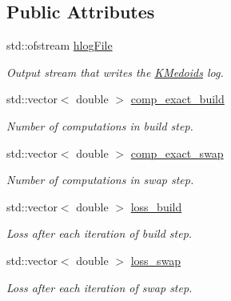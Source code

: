 \subsection*{Public Attributes}
\begin{DoxyCompactItemize}
\item 
\mbox{\label{structLogHelper_a084e11845451a653f46a48ab92c97ee8}} 
std\+::ofstream \hyperlink{structLogHelper_a084e11845451a653f46a48ab92c97ee8}{hlog\+File}
\begin{DoxyCompactList}\small\item\em Output stream that writes the \hyperlink{classKMedoids}{K\+Medoids} log. \end{DoxyCompactList}\item 
\mbox{\label{structLogHelper_a7f9490e07d6bfc71b0d0fd555ca4f530}} 
std\+::vector$<$ double $>$ \hyperlink{structLogHelper_a7f9490e07d6bfc71b0d0fd555ca4f530}{comp\+\_\+exact\+\_\+build}
\begin{DoxyCompactList}\small\item\em Number of computations in build step. \end{DoxyCompactList}\item 
\mbox{\label{structLogHelper_aaee1d830760c6b497f2fad31a0e368f8}} 
std\+::vector$<$ double $>$ \hyperlink{structLogHelper_aaee1d830760c6b497f2fad31a0e368f8}{comp\+\_\+exact\+\_\+swap}
\begin{DoxyCompactList}\small\item\em Number of computations in swap step. \end{DoxyCompactList}\item 
\mbox{\label{structLogHelper_a8da7e85d166977478fcfe848bb739dfa}} 
std\+::vector$<$ double $>$ \hyperlink{structLogHelper_a8da7e85d166977478fcfe848bb739dfa}{loss\+\_\+build}
\begin{DoxyCompactList}\small\item\em Loss after each iteration of build step. \end{DoxyCompactList}\item 
\mbox{\label{structLogHelper_a3361ae9284a7fca5b867165e0380af4b}} 
std\+::vector$<$ double $>$ \hyperlink{structLogHelper_a3361ae9284a7fca5b867165e0380af4b}{loss\+\_\+swap}
\begin{DoxyCompactList}\small\item\em Loss after each iteration of swap step. \end{DoxyCompactList}\item 

\end{DoxyCompactItemize}
